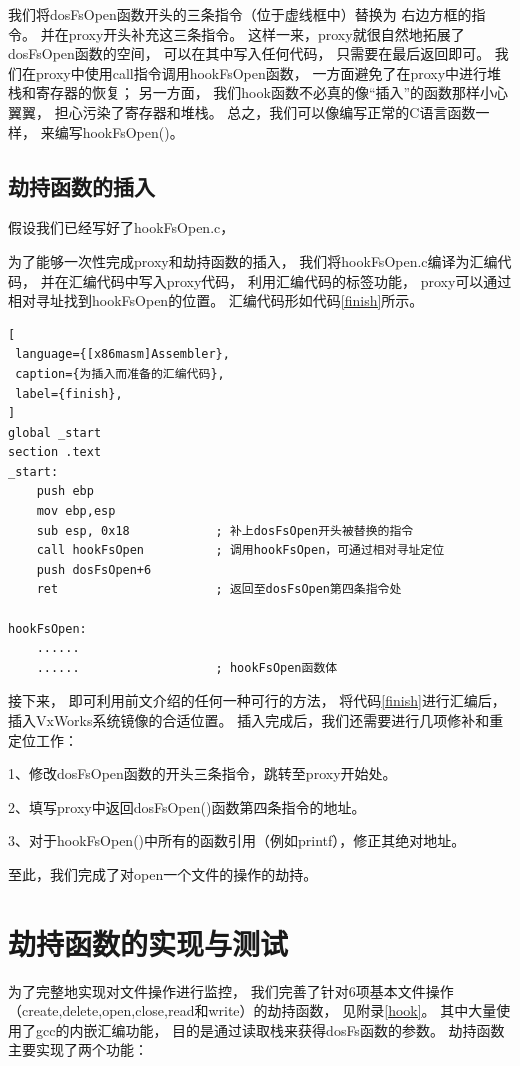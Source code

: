 我们将dosFsOpen函数开头的三条指令（位于虚线框中）替换为
右边方框的指令。
并在proxy开头补充这三条指令。
这样一来，proxy就很自然地拓展了dosFsOpen函数的空间，
可以在其中写入任何代码，
只需要在最后返回即可。
我们在proxy中使用call指令调用hookFsOpen函数，
一方面避免了在proxy中进行堆栈和寄存器的恢复；
另一方面，
我们hook函数不必真的像“插入”的函数那样小心翼翼，
担心污染了寄存器和堆栈。
总之，我们可以像编写正常的C语言函数一样，
来编写hookFsOpen()。

\subsection{劫持函数的插入}

假设我们已经写好了hookFsOpen.c，

为了能够一次性完成proxy和劫持函数的插入，
我们将hookFsOpen.c编译为汇编代码，
并在汇编代码中写入proxy代码，
利用汇编代码的标签功能，
proxy可以通过相对寻址找到hookFsOpen的位置。
汇编代码形如代码\ref{finish}所示。
\begin{lstlisting}[
 language={[x86masm]Assembler},
 caption={为插入而准备的汇编代码},
 label={finish},
]
global _start
section .text
_start:
    push ebp
    mov ebp,esp
    sub esp, 0x18            ; 补上dosFsOpen开头被替换的指令
    call hookFsOpen          ; 调用hookFsOpen，可通过相对寻址定位
    push dosFsOpen+6
    ret                      ; 返回至dosFsOpen第四条指令处

hookFsOpen:
    ......
    ......                   ; hookFsOpen函数体
\end{lstlisting}

接下来，
即可利用前文介绍的任何一种可行的方法，
将代码\ref{finish}进行汇编后，
插入VxWorks系统镜像的合适位置。
插入完成后，我们还需要进行几项修补和重定位工作：

1、修改dosFsOpen函数的开头三条指令，跳转至proxy开始处。

2、填写proxy中返回dosFsOpen()函数第四条指令的地址。

3、对于hookFsOpen()中所有的函数引用（例如printf），修正其绝对地址。

至此，我们完成了对open一个文件的操作的劫持。


\section{劫持函数的实现与测试}

为了完整地实现对文件操作进行监控，
我们完善了针对6项基本文件操作（create,delete,open,close,read和write）的劫持函数，
见附录\ref{hook}。
其中大量使用了gcc的内嵌汇编功能，
目的是通过读取栈来获得dosFs函数的参数。
劫持函数主要实现了两个功能：

